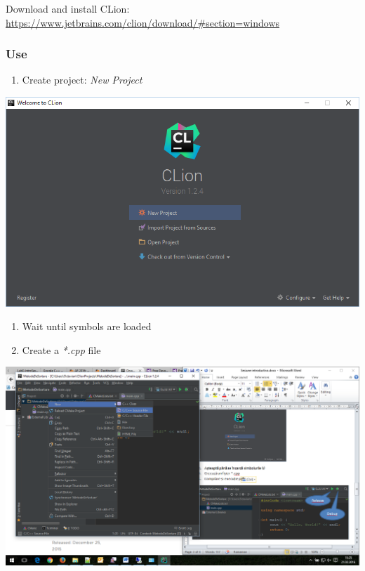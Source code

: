 \documentclass[../en-fa-lab.tex]{subfiles}
\begin{document}
Download and install CLion:
\url{https://www.jetbrains.com/clion/download/\#section=windows}

\subsubsection{Use}\label{use-1}

\begin{enumerate}
\def\labelenumi{\arabic{enumi}.}
\item
  Create project: \emph{New Project}
\end{enumerate}

\includegraphics[width=\textwidth]{../Resources/lab0/image8.png}

\begin{enumerate}
\def\labelenumi{\arabic{enumi}.}
\setcounter{enumi}{1}
\item
  Wait until symbols are loaded
\item
  Create a \emph{*.cpp} file
\end{enumerate}

\includegraphics[width=\textwidth]{../Resources/lab0/image9.png}
\end{document}
